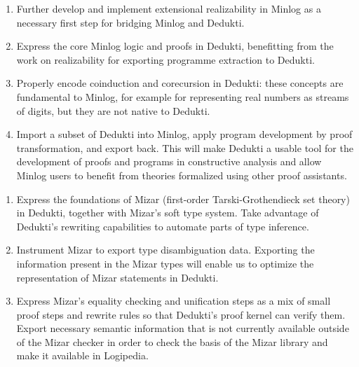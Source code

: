 \begin{workpackage}
\begin{tasklist}
\begin{task}[id=minlog,
  title=Express the theory of Minlog in Dedukti,
  lead=Lmu,
  LmuRM=16, %
  wphases=1-48,
  ]
  \begin{enumerate}
  \item Further develop and implement extensional realizability in Minlog as
    a necessary first step for bridging Minlog and Dedukti.
  \item Express the core Minlog logic and proofs in Dedukti, benefitting from
    the work on realizability for exporting programme extraction to Dedukti.
  \item Properly encode coinduction and corecursion in Dedukti: these concepts are
    fundamental to Minlog, for example for representing real numbers as streams of
    digits, but they are not native to Dedukti.
  \item Import a subset of Dedukti into Minlog, apply program development by proof
    transformation, and export back. This will make Dedukti a usable tool for the
    development of proofs and programs in constructive analysis and allow Minlog
    users to benefit from theories formalized using other proof assistants.
  \end{enumerate}
\end{task}

\begin{task}[id=mizar,
  title=Express the theory of Mizar in Dedukti,
  lead=Bia,   %
  BiaRM=70, %
  InnRM=9,   %
  wphases=1-48,
  ]
  \begin{enumerate}
  \item Express the foundations of Mizar (first-order Tarski-Grothendieck set
    theory) in Dedukti, together with Mizar's soft
    type system. Take advantage of Dedukti's rewriting capabilities to automate
    parts of type inference.
  \item Instrument Mizar to export type disambiguation data. Exporting the
    information present in the Mizar types will enable us to optimize the
    representation of Mizar statements in Dedukti.
  \item Express Mizar's equality checking and unification steps as a mix of
    small proof steps and rewrite rules so that Dedukti's proof kernel can
    verify them. Export necessary semantic information that is not currently
    available outside of the Mizar checker in order to check the basis of the
    Mizar library and make it available in Logipedia.
  \end{enumerate}
\end{task}


\end{tasklist}
\end{workpackage}
